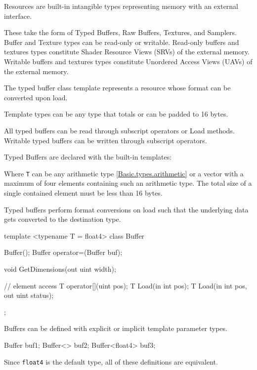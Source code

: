 
Resources are built-in intangible types representing memory with an external interface.

These take the form of Typed Buffers, Raw Buffers, Textures, and Samplers.
Buffer and Texture types can be read-only or writable.
Read-only buffers and textures types constitute Shader Resource Views (SRVs) of the external memory.
Writable buffers and textures types constitute Unordered Access Views (UAVs) of the external memory.


The typed buffer class template represents a resource whose format can be converted upon load.

Template types can be any type that totals or can be padded to 16 bytes.

All typed buffers can be read through subscript operators or Load methods.
Writable typed buffers can be written through subscript operators.

Typed Buffers are declared with the built-in templates:

Where \texttt{T} can be any arithmetic type \ref{Basic.types.arithmetic}
or a vector with a maximum of four elements containing such an arithmetic type.
The total size of a single contained element must be less than 16 bytes.

Typed buffers perform format conversions on load such that the underlying data
gets converted to the destination type.


\begin{HLSL}
template <typename T = float4>
 class Buffer {
   Buffer();
   Buffer operator=(Buffer buf);

   void GetDimensions(out uint width);

   // element access
   T operator[](uint pos);
   T Load(in int pos);
   T Load(in int pos, out uint status);
};
\end{HLSL}


Buffers can be defined with explicit or implicit template parameter types.
\begin{HLSL}
  Buffer buf1;
  Buffer<> buf2;
  Buffer<float4> buf3;
\end{HLSL}
Since \texttt{float4} is the default type, all of these definitions are equivalent.


